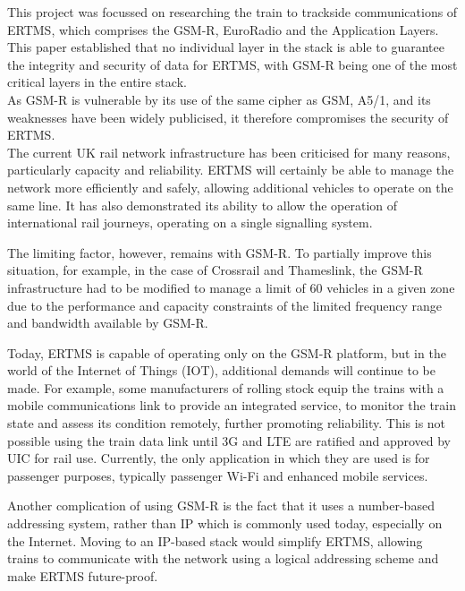 \documentclass[twoside,11pt,a4paper]{article}
\begin{document}
This project was focussed on researching the train to trackside communications of ERTMS, which comprises the GSM-R, EuroRadio and the Application Layers.\\This paper established that no individual layer in the stack is able to guarantee the integrity and security of data for ERTMS, with GSM-R being one of the most critical layers in the entire stack.\\As GSM-R is vulnerable by its use of the same cipher as GSM, A5/1, and its weaknesses have been widely publicised, it therefore compromises the security of ERTMS.\\The current UK rail network infrastructure has been criticised for many reasons, particularly capacity and reliability. ERTMS will certainly be able to manage the network more efficiently and safely, allowing additional vehicles to operate on the same line. It has also demonstrated its ability to allow the operation of international rail journeys, operating on a single signalling system.

The limiting factor, however, remains with GSM-R. To partially improve this situation, for example, in the case of Crossrail and Thameslink, the GSM-R infrastructure had to be modified to manage a limit of 60 vehicles in a given zone due to the performance and capacity constraints of the limited frequency range and bandwidth available by GSM-R\citep{FT13a}.

Today, ERTMS is capable of operating only on the GSM-R platform, but in the world of the Internet of Things (IOT), additional demands will continue to be made. For example, some manufacturers of rolling stock equip the trains with a mobile communications link to provide an integrated service, to monitor the train state and assess its condition remotely, further promoting reliability. This is not possible using the train data link until 3G and LTE are ratified and approved by UIC for rail use. Currently, the only application in which they are used is for passenger purposes, typically passenger Wi-Fi and enhanced mobile services.

Another complication of using GSM-R is the fact that it uses a number-based addressing system, rather than IP which is commonly used today, especially on the Internet. Moving to an IP-based stack would simplify ERTMS, allowing trains to communicate with the network using a logical addressing scheme and make ERTMS future-proof.
\end{document}
